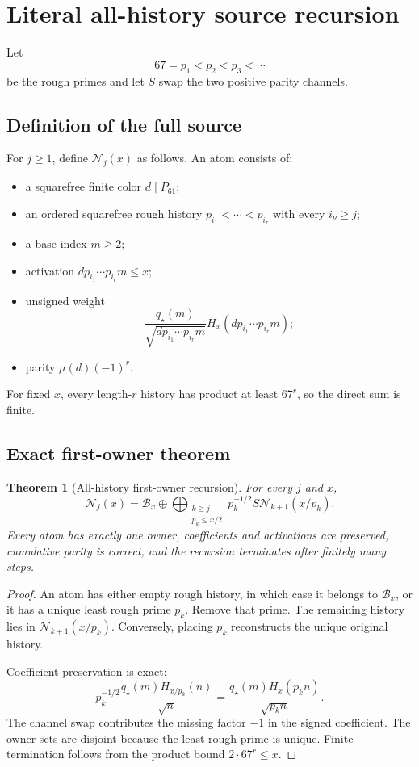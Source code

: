 \documentclass[11pt]{article}
\newtheorem{theorem}{Theorem}[section]
\newcommand{\Psmall}{P_{61}}
\newcommand{\Source}{\mathcal N}
\newcommand{\Base}{\mathcal B}
\begin{document}
\section{Literal all-history source recursion}

Let
\[
67=p_1<p_2<p_3<\cdots
\]
be the rough primes and let $S$ swap the two positive parity channels.

\subsection{Definition of the full source}
For $j\ge1$, define $\Source_j(x)$ as follows.  An atom consists of:
\begin{itemize}
\item a squarefree finite color $d\mid\Psmall$;
\item an ordered squarefree rough history $p_{i_1}<\cdots<p_{i_r}$ with every $i_\nu\ge j$;
\item a base index $m\ge2$;
\item activation $d p_{i_1}\cdots p_{i_r}m\le x$;
\item unsigned weight
\[
 \frac{q_\star(m)}{\sqrt{d p_{i_1}\cdots p_{i_r}m}}
 H_x(d p_{i_1}\cdots p_{i_r}m);
\]
\item parity $\mu(d)(-1)^r$.
\end{itemize}
For fixed $x$, every length-$r$ history has product at least $67^r$, so the direct sum is finite.

\subsection{Exact first-owner theorem}
\begin{theorem}[All-history first-owner recursion]\label{thm:all-history}
For every $j$ and $x$,
\begin{equation}
\boxed{
 \Source_j(x)=\Base_x\oplus
 \bigoplus_{\substack{k\ge j\\p_k\le x/2}}
 p_k^{-1/2}S\Source_{k+1}(x/p_k).
}
\label{eq:all-history-source}
\end{equation}
Every atom has exactly one owner, coefficients and activations are preserved, cumulative parity is correct, and the recursion terminates after finitely many steps.
\end{theorem}

\begin{proof}
An atom has either empty rough history, in which case it belongs to $\Base_x$, or it has a unique least rough prime $p_k$.  Remove that prime.  The remaining history lies in $\Source_{k+1}(x/p_k)$.  Conversely, placing $p_k$ reconstructs the unique original history.

Coefficient preservation is exact:
\[
 p_k^{-1/2}
 \frac{q_\star(m)H_{x/p_k}(n)}{\sqrt n}
 =
 \frac{q_\star(m)H_x(p_kn)}{\sqrt{p_kn}}.
\]
The channel swap contributes the missing factor $-1$ in the signed coefficient.  The owner sets are disjoint because the least rough prime is unique.  Finite termination follows from the product bound $2\cdot67^r\le x$.
\end{proof}
\end{document}
